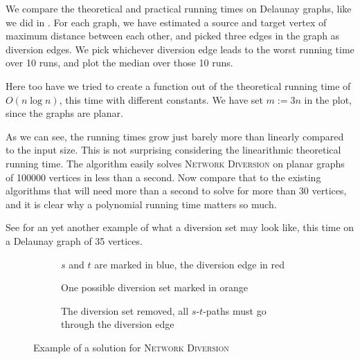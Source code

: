 We compare the theoretical and practical running times on Delaunay graphs, like we did in . For each graph, we have estimated a source and target vertex of maximum distance between each other, and picked three edges in the graph as diversion edges. We pick whichever diversion edge leads to the worst running time over 10 runs, and plot the median over those 10 runs.

Here too have we tried to create a function out of the theoretical running time of $O(n \log n)$, this time with different constants. We have set $m := 3n$ in the plot, since the graphs are planar.

\begin{center}
        
\end{center}

As we can see, the running times grow just barely more than linearly compared to the input size. This is not surprising considering the linearithmic theoretical running time. The algorithm easily solves \textsc{Network Diversion} on planar graphs of 100000 vertices in less than a second. Now compare that to the existing algorithms that will need more than a second to solve for more than 30 vertices, and it is clear why a polynomial running time matters so much.

See  for an yet another example of what a diversion set may look like, this time on a Delaunay graph of 35 vertices.

\noindent
\begin{figure}
    \centering
    \begin{subfigure}{.32\textwidth}
        \centering
        
        \caption{$s$ and $t$ are marked in blue, the diversion edge in red}
        \label{subfigure:network-diversion-input}
    \end{subfigure}\hfill%
    \begin{subfigure}{.32\textwidth}
        \centering
        
        \caption{One possible diversion set marked in orange}
        \label{subfigure:network-diversion-diversion}
    \end{subfigure}\hfill%
    \begin{subfigure}{.32\textwidth}
        \centering
        
        \caption{The diversion set removed, all $s$-$t$-paths must go through the diversion edge}
        \label{subfigure:network-diversion-diverted}
    \end{subfigure}\hfill%
    \caption{Example of a solution for \textsc{Network Diversion}}
    \label{figure:network-diversion-on-delaunay}
\end{figure}
